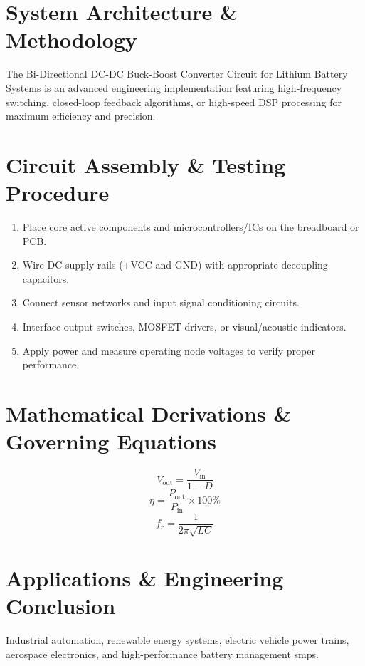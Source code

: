 \documentclass[11pt,a4paper]{article}
\begin{document}
\section{System Architecture \& Methodology}
The Bi-Directional DC-DC Buck-Boost Converter Circuit for Lithium Battery Systems is an advanced engineering implementation featuring high-frequency switching, closed-loop feedback algorithms, or high-speed DSP processing for maximum efficiency and precision.

\section{Circuit Assembly \& Testing Procedure}
\begin{enumerate}
    \item Place core active components and microcontrollers/ICs on the breadboard or PCB.
    \item Wire DC supply rails (+VCC and GND) with appropriate decoupling capacitors.
    \item Connect sensor networks and input signal conditioning circuits.
    \item Interface output switches, MOSFET drivers, or visual/acoustic indicators.
    \item Apply power and measure operating node voltages to verify proper performance.
\end{enumerate}

\section{Mathematical Derivations \& Governing Equations}
\begin{equation}
V_{\text{out}} = \frac{V_{\text{in}}}{1 - D}
\end{equation}
\begin{equation}
\eta = \frac{P_{\text{out}}}{P_{\text{in}}} \times 100\%
\end{equation}
\begin{equation}
f_r = \frac{1}{2\pi \sqrt{L C}}
\end{equation}

\section{Applications \& Engineering Conclusion}
Industrial automation, renewable energy systems, electric vehicle power trains, aerospace electronics, and high-performance battery management smps.
\end{document}
